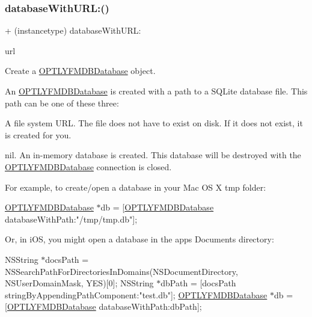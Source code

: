 \subsubsection{\texorpdfstring{database\+With\+U\+R\+L\+:()}{databaseWithURL:()}}
{\footnotesize\ttfamily + (instancetype) database\+With\+U\+R\+L\+: \begin{DoxyParamCaption}\item[{(N\+S\+U\+RL $\ast$\+\_\+\+Nullable)}]{url }\end{DoxyParamCaption}}

Create a {\ttfamily \mbox{\hyperlink{interface_o_p_t_l_y_f_m_d_b_database}{O\+P\+T\+L\+Y\+F\+M\+D\+B\+Database}}} object.

An {\ttfamily \mbox{\hyperlink{interface_o_p_t_l_y_f_m_d_b_database}{O\+P\+T\+L\+Y\+F\+M\+D\+B\+Database}}} is created with a path to a S\+Q\+Lite database file. This path can be one of these three\+:


\begin{DoxyEnumerate}
\item A file system U\+RL. The file does not have to exist on disk. If it does not exist, it is created for you.
\item {\ttfamily nil}. An in-\/memory database is created. This database will be destroyed with the {\ttfamily \mbox{\hyperlink{interface_o_p_t_l_y_f_m_d_b_database}{O\+P\+T\+L\+Y\+F\+M\+D\+B\+Database}}} connection is closed.
\end{DoxyEnumerate}

For example, to create/open a database in your Mac OS X {\ttfamily tmp} folder\+:

\mbox{\hyperlink{interface_o_p_t_l_y_f_m_d_b_database}{O\+P\+T\+L\+Y\+F\+M\+D\+B\+Database}} $\ast$db = \mbox{[}\mbox{\hyperlink{interface_o_p_t_l_y_f_m_d_b_database}{O\+P\+T\+L\+Y\+F\+M\+D\+B\+Database}} database\+With\+Path\+:"/tmp/tmp.db"\mbox{]};

Or, in i\+OS, you might open a database in the app\textquotesingle{}s {\ttfamily Documents} directory\+:

N\+S\+String $\ast$docs\+Path = N\+S\+Search\+Path\+For\+Directories\+In\+Domains(\+N\+S\+Document\+Directory, N\+S\+User\+Domain\+Mask, Y\+E\+S)\mbox{[}0\mbox{]}; N\+S\+String $\ast$db\+Path = \mbox{[}docs\+Path string\+By\+Appending\+Path\+Component\+:"test.\+db"\mbox{]}; \mbox{\hyperlink{interface_o_p_t_l_y_f_m_d_b_database}{O\+P\+T\+L\+Y\+F\+M\+D\+B\+Database}} $\ast$db = \mbox{[}\mbox{\hyperlink{interface_o_p_t_l_y_f_m_d_b_database}{O\+P\+T\+L\+Y\+F\+M\+D\+B\+Database}} database\+With\+Path\+:db\+Path\mbox{]};

